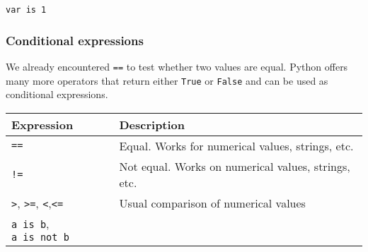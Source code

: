 \documentclass[10pt]{scrartcl}
\begin{document}
    \begin{Verbatim}[commandchars=\\\{\}]
var is 1
    \end{Verbatim}

    \hypertarget{conditional-expressions}{%
\subsubsection{Conditional expressions}\label{conditional-expressions}}

We already encountered \texttt{==} to test whether two values are equal.
Python offers many more operators that return either \texttt{True} or
\texttt{False} and can be used as conditional expressions.

\begin{longtable}[]{@{}ll@{}}
\toprule
\begin{minipage}[b]{0.51\columnwidth}\raggedright
Expression\strut
\end{minipage} & \begin{minipage}[b]{0.43\columnwidth}\raggedright
Description\strut
\end{minipage}\tabularnewline
\midrule
\endhead
\begin{minipage}[t]{0.51\columnwidth}\raggedright
\texttt{==}\strut
\end{minipage} & \begin{minipage}[t]{0.43\columnwidth}\raggedright
Equal. Works for numerical values, strings, etc.\strut
\end{minipage}\tabularnewline
\begin{minipage}[t]{0.51\columnwidth}\raggedright
\texttt{!=}\strut
\end{minipage} & \begin{minipage}[t]{0.43\columnwidth}\raggedright
Not equal. Works on numerical values, strings, etc.\strut
\end{minipage}\tabularnewline
\begin{minipage}[t]{0.51\columnwidth}\raggedright
\texttt{\textgreater{}}, \texttt{\textgreater{}=},
\texttt{\textless{}},\texttt{\textless{}=}\strut
\end{minipage} & \begin{minipage}[t]{0.43\columnwidth}\raggedright
Usual comparison of numerical values\strut
\end{minipage}\tabularnewline
\begin{minipage}[t]{0.51\columnwidth}\raggedright
\texttt{a\ is\ b}, \texttt{a\ is\ not\ b}\strut
\end{minipage} & \begin{minipage}[t]{0.43\columnwidth}\raggedright

\end{minipage}
\end{longtable}
\end{document}
